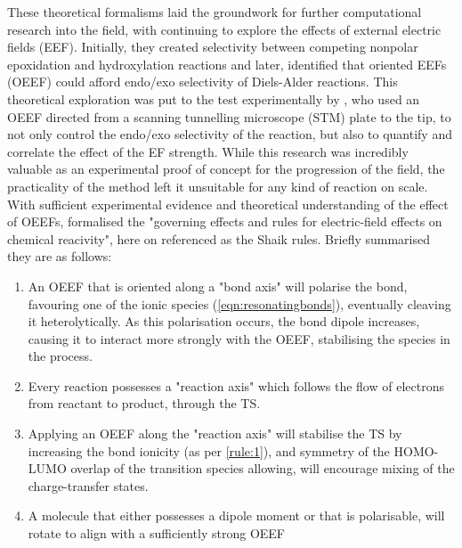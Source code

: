 These theoretical formalisms laid the groundwork for further computational research into the field, with \citeauthor{Shaik2004} continuing to explore the effects of external electric fields (EEF). Initially, they created selectivity between competing nonpolar epoxidation and hydroxylation reactions\cite{Shaik2004} and later,  identified that oriented EEFs (OEEF) could afford endo/exo selectivity of Diels-Alder reactions. This theoretical exploration was put to the test experimentally by , who used an OEEF directed from a scanning tunnelling microscope (STM) plate to the tip, to not only control the endo/exo selectivity of the reaction, but also to quantify and correlate the effect of the EF strength. While this research was incredibly valuable as an experimental proof of concept for the progression of the field, the practicality of the method left it unsuitable for any kind of reaction on scale.\\

With sufficient experimental evidence and theoretical understanding of the effect of OEEFs, \citeauthor{Shaik2020} formalised the "governing effects and rules for electric-field effects on chemical reacivity"\cite{Shaik2020}, here on referenced as the Shaik rules. Briefly summarised they are as follows:

\begin{enumerate}[label=Rule \roman*), ref=rule (\roman*), noitemsep]
	\item\label{rule:1} An OEEF that is oriented along a "bond axis" will polarise the bond, favouring one of the ionic species (\ref{eqn:resonatingbonds}), eventually cleaving it heterolytically. As this polarisation occurs, the bond dipole increases, causing it to interact more strongly with the OEEF, stabilising the species in the process. 
	\item\label{rule:2}  Every reaction possesses a "reaction axis" which follows the flow of electrons from reactant to product, through the TS.
	\item\label{rule:3}  Applying an OEEF along the "reaction axis" will stabilise the TS by increasing the bond ionicity (as per \ref{rule:1}), and symmetry of the HOMO-LUMO overlap of the transition species allowing, will encourage mixing of the charge-transfer states.
	\item\label{rule:4}  A molecule that either possesses a dipole moment or that is polarisable, will rotate to align with a sufficiently strong OEEF
\end{enumerate}


